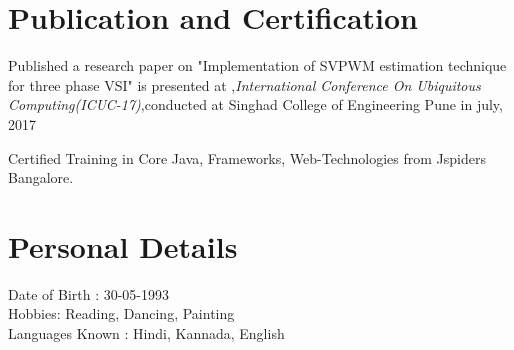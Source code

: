 \documentclass[margin,line]{res}
\begin{document}
\begin{resume}
\section{\sc \bf Publication and Certification}
 Published a research paper on "Implementation of SVPWM estimation technique for three phase VSI" is presented at ,{\em International Conference On Ubiquitous Computing(ICUC-17)},conducted at Singhad College of Engineering Pune in july, 2017
 
 Certified Training in Core Java, Frameworks, Web-Technologies from Jspiders Bangalore.

\section{\sc \bf Personal Details}
{Date of Birth : 30-05-1993}\\
{Hobbies: Reading, Dancing, Painting}\\
{Languages Known : Hindi, Kannada, English}\\
\end{resume}
\end{document}
